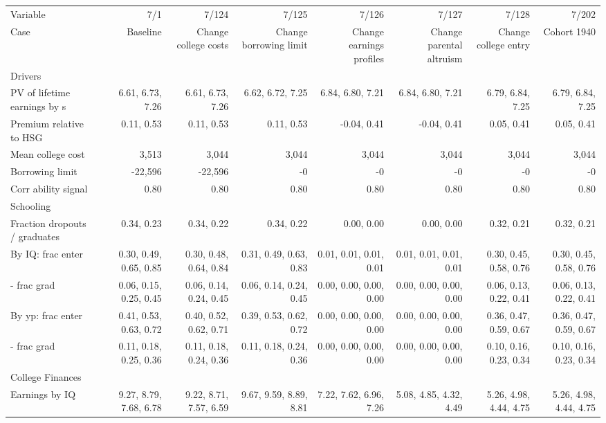 \begin{tabular}{lrrrrrrr}
\hline
Variable & 7/1  & 7/124  & 7/125  & 7/126  & 7/127  & 7/128  & 7/202  \\ 
Case & Baseline  & Change college costs  & Change borrowing limit  & Change earnings profiles  & Change parental altruism  & Change college entry  & Cohort 1940  \\ 
Drivers &   &   &   &   &   &   &   \\ 
PV of lifetime earnings by s & 6.61, 6.73, 7.26  & 6.61, 6.73, 7.26  & 6.62, 6.72, 7.25  & 6.84, 6.80, 7.21  & 6.84, 6.80, 7.21  & 6.79, 6.84, 7.25  & 6.79, 6.84, 7.25  \\ 
Premium relative to HSG & 0.11, 0.53  & 0.11, 0.53  & 0.11, 0.53  & -0.04, 0.41  & -0.04, 0.41  & 0.05, 0.41  & 0.05, 0.41  \\ 
Mean college cost & 3,513  & 3,044  & 3,044  & 3,044  & 3,044  & 3,044  & 3,044  \\ 
Borrowing limit & -22,596  & -22,596  & -0  & -0  & -0  & -0  & -0  \\ 
Corr ability signal & 0.80  & 0.80  & 0.80  & 0.80  & 0.80  & 0.80  & 0.80  \\ 
\hline
Schooling &   &   &   &   &   &   &   \\ 
Fraction dropouts / graduates & 0.34, 0.23  & 0.34, 0.22  & 0.34, 0.22  & 0.00, 0.00  & 0.00, 0.00  & 0.32, 0.21  & 0.32, 0.21  \\ 
By IQ: frac enter & 0.30, 0.49, 0.65, 0.85  & 0.30, 0.48, 0.64, 0.84  & 0.31, 0.49, 0.63, 0.83  & 0.01, 0.01, 0.01, 0.01  & 0.01, 0.01, 0.01, 0.01  & 0.30, 0.45, 0.58, 0.76  & 0.30, 0.45, 0.58, 0.76  \\ 
- frac grad & 0.06, 0.15, 0.25, 0.45  & 0.06, 0.14, 0.24, 0.45  & 0.06, 0.14, 0.24, 0.45  & 0.00, 0.00, 0.00, 0.00  & 0.00, 0.00, 0.00, 0.00  & 0.06, 0.13, 0.22, 0.41  & 0.06, 0.13, 0.22, 0.41  \\ 
By yp: frac enter & 0.41, 0.53, 0.63, 0.72  & 0.40, 0.52, 0.62, 0.71  & 0.39, 0.53, 0.62, 0.72  & 0.00, 0.00, 0.00, 0.00  & 0.00, 0.00, 0.00, 0.00  & 0.36, 0.47, 0.59, 0.67  & 0.36, 0.47, 0.59, 0.67  \\ 
- frac grad & 0.11, 0.18, 0.25, 0.36  & 0.11, 0.18, 0.24, 0.36  & 0.11, 0.18, 0.24, 0.36  & 0.00, 0.00, 0.00, 0.00  & 0.00, 0.00, 0.00, 0.00  & 0.10, 0.16, 0.23, 0.34  & 0.10, 0.16, 0.23, 0.34  \\ 
\hline
College Finances &   &   &   &   &   &   &   \\ 
Earnings by IQ & 9.27, 8.79, 7.68, 6.78  & 9.22, 8.71, 7.57, 6.59  & 9.67, 9.59, 8.89, 8.81  & 7.22, 7.62, 6.96, 7.26  & 5.08, 4.85, 4.32, 4.49  & 5.26, 4.98, 4.44, 4.75  & 5.26, 4.98, 4.44, 4.75  \\ 

\end{tabular}
